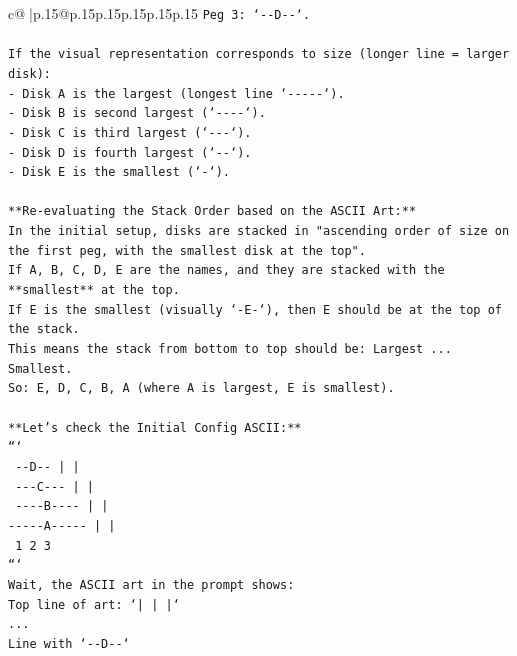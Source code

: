 \documentclass{article}
\begin{document}
{\begin{supertabular}{c@{$\;$}|p{.15\linewidth}@{}p{.15\linewidth}p{.15\linewidth}p{.15\linewidth}p{.15\linewidth}p{.15\linewidth}}
{{{\texttt{Peg 3: `{-}{-}D{-}{-}`.} \\
\\ 
\texttt{If the visual representation corresponds to size (longer line = larger disk):} \\
\texttt{{-} Disk A is the largest (longest line `{-}{-}{-}{-}{-}`).} \\
\texttt{{-} Disk B is second largest (`{-}{-}{-}{-}`).} \\
\texttt{{-} Disk C is third largest (`{-}{-}{-}`).} \\
\texttt{{-} Disk D is fourth largest (`{-}{-}`).} \\
\texttt{{-} Disk E is the smallest (`{-}`).} \\
\\ 
\texttt{**Re{-}evaluating the Stack Order based on the ASCII Art:**} \\
\texttt{In the initial setup, disks are stacked in "ascending order of size on the first peg, with the smallest disk at the top".} \\
\texttt{If A, B, C, D, E are the names, and they are stacked with the **smallest** at the top.} \\
\texttt{If E is the smallest (visually `{-}E{-}`), then E should be at the top of the stack.} \\
\texttt{This means the stack from bottom to top should be: Largest ... Smallest.} \\
\texttt{So: E, D, C, B, A (where A is largest, E is smallest).} \\
\\ 
\texttt{**Let's check the Initial Config ASCII:**} \\
\texttt{```} \\
\texttt{   {-}{-}D{-}{-}         |           |     } \\
\texttt{  {-}{-}{-}C{-}{-}{-}        |           |     } \\
\texttt{ {-}{-}{-}{-}B{-}{-}{-}{-}       |           |     } \\
\texttt{{-}{-}{-}{-}{-}A{-}{-}{-}{-}{-}      |           |     } \\
\texttt{     1           2           3     } \\
\texttt{```} \\
\texttt{Wait, the ASCII art in the prompt shows:} \\
\texttt{Top line of art: `| | |`} \\
\texttt{...} \\
\texttt{Line with `{-}{-}D{-}{-}`} \\
}}}
\end{supertabular}}
\end{document}
